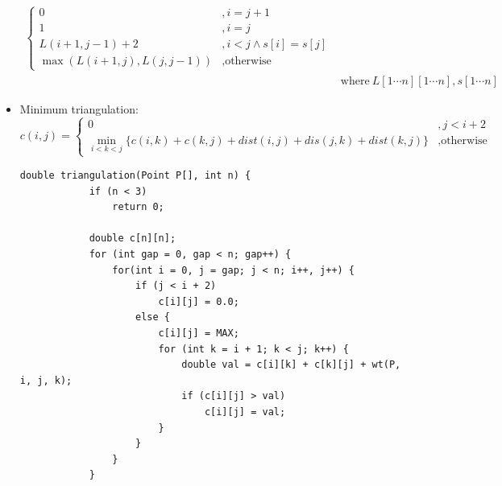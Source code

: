 \begin{itemize}
\begin{equation}
\begin{aligned}
\begin{cases}
                0 &, i = j + 1 \\
                1 &, i = j \\
                L(i + 1, j - 1) + 2 &, i < j \land s[i] = s[j] \\
                \max(L(i + 1, j), L(j, j - 1)) &, \text{otherwise}
            \end{cases} \\
            & \text{where} \ L[1 \cdots n][1 \cdots n], s[1 \cdots n]
        \end{aligned}
    \end{equation}
    \item Minimum triangulation: \begin{equation}
        c(i, j) = \begin{cases}
            0 &, j < i + 2 \\
            \min_{i < k < j}\{c(i, k) + c(k, j) + dist(i, j) + dis(j, k) + dist(k, j)\} &, \text{otherwise}
        \end{cases}
    \end{equation} \begin{lstlisting}[caption={Minimum triangulation.}, captionpos=b]
        double triangulation(Point P[], int n) {
            if (n < 3)
                return 0;
            
            double c[n][n];
            for (int gap = 0, gap < n; gap++) {
                for(int i = 0, j = gap; j < n; i++, j++) {
                    if (j < i + 2)
                        c[i][j] = 0.0;
                    else {
                        c[i][j] = MAX;
                        for (int k = i + 1; k < j; k++) {
                            double val = c[i][k] + c[k][j] + wt(P, i, j, k);
                            if (c[i][j] > val)
                                c[i][j] = val;
                        }
                    }
                }
            }


\end{lstlisting}
\end{itemize}
